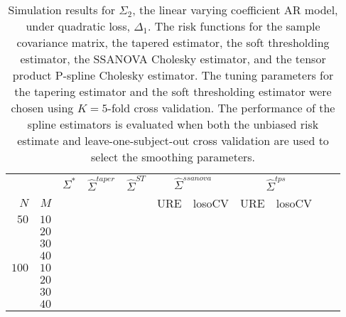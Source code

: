 \documentclass[12pt]{article}
\newcommand{\ra}[1]{\renewcommand{\arraystretch}{#1}}
\theoremstyle{definition}
\begin{document}
\begin{table}\centering
\ra{1.3}
\caption{Simulation results for $\Sigma_2$, the linear varying coefficient AR model, under quadratic loss, $\Delta_1$. The risk functions for the sample covariance matrix, the tapered estimator, the soft thresholding estimator, the SSANOVA Cholesky estimator, and the tensor product P-spline Cholesky estimator. The tuning parameters for the tapering estimator and the soft thresholding estimator were chosen using $K = 5$-fold cross validation. The performance of the spline estimators is evaluated when both the unbiased risk estimate and leave-one-subject-out cross validation are used to select the smoothing parameters.}
\begin{tabular}{@{}rrrcrcrrcrr@{}}\toprule
   &            & \multicolumn{1}{c}{$\Sigma^*$}  & \multicolumn{1}{c}{$\hat{\Sigma}^{taper}$} &\multicolumn{1}{c}{$\hat{\Sigma}^{ST}$} &\multicolumn{2}{c}{ $\hat{\Sigma}^{ssanova}$} &  \multicolumn{2}{c}{ $\hat{\Sigma}^{tps}$}\\
$N$ & $M$ 	&	  &	& & \multicolumn{1}{c}{\mbox{URE}} & \multicolumn{1}{c}{\mbox{losoCV}} &\multicolumn{1}{c}{\mbox{URE}} & \multicolumn{1}{c}{\mbox{losoCV}}\\ \midrule
$50$ & $10$\\
  & $20$  &&&&&&&\\
  & $30$   &&&&&&&\\
& $40$   &&&&&&&\\ 
$100$ & $10$ &&&&&&&\\
& $20$  &&&&&&& \\
& $30$  &&&&&&& \\
& $40$  &&&&&&& \\ 
\bottomrule
\end{tabular}
\end{table}
\end{document}
